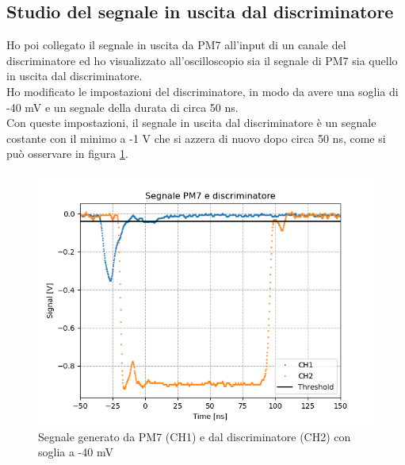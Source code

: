 \documentclass{article}
\begin{document}
\subsection{Studio del segnale in uscita dal discriminatore}
Ho poi collegato il segnale in uscita da PM7 all'input di un canale del discriminatore ed ho visualizzato all'oscilloscopio sia il segnale di PM7 sia quello in uscita dal discriminatore. \\
Ho modificato le impostazioni del discriminatore, in modo da avere una soglia di -40 mV e un segnale della durata di circa 50 ns.\\
Con queste impostazioni, il segnale in uscita dal discriminatore è un segnale costante con il minimo a -1 V che si azzera di nuovo dopo circa 50 ns, come si può osservare in figura \ref{discr}.

\begin{figure}[h!]
\begin{center}
\includegraphics[scale=0.7]{Grafici/PM5_discriminatore.png}
\caption{Segnale generato da PM7 (CH1) e dal discriminatore (CH2) con soglia a -40 mV} \label{discr}
\end{center}
\end{figure}
\end{document}
